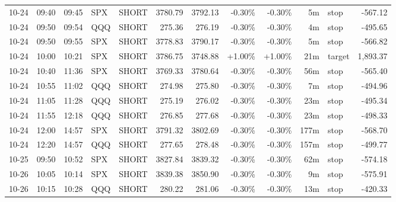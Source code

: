 \documentclass[11pt,a4paper]{article}
\begin{document}
\begin{center}
\begin{longtable}{>{\color{txtmain}}l l l l l r r r r r >{\color{txtmain}}l r}
10-24 & 09:40 & 09:45 & SPX & SHORT & 3780.79 & 3792.13 & \textcolor{lossred}{-0.30\%} & \textcolor{lossred}{-0.30\%} & 5m & stop & \textcolor{lossred}{-567.12} \\
10-24 & 09:50 & 09:54 & QQQ & SHORT & 275.36 & 276.19 & \textcolor{lossred}{-0.30\%} & \textcolor{lossred}{-0.30\%} & 4m & stop & \textcolor{lossred}{-495.65} \\
10-24 & 09:50 & 09:55 & SPX & SHORT & 3778.83 & 3790.17 & \textcolor{lossred}{-0.30\%} & \textcolor{lossred}{-0.30\%} & 5m & stop & \textcolor{lossred}{-566.82} \\
10-24 & 10:00 & 10:21 & SPX & SHORT & 3786.75 & 3748.88 & \textcolor{wingreen}{+1.00\%} & \textcolor{wingreen}{+1.00\%} & 21m & target & \textcolor{wingreen}{1,893.37} \\
10-24 & 10:40 & 11:36 & SPX & SHORT & 3769.33 & 3780.64 & \textcolor{lossred}{-0.30\%} & \textcolor{lossred}{-0.30\%} & 56m & stop & \textcolor{lossred}{-565.40} \\
10-24 & 10:55 & 11:02 & QQQ & SHORT & 274.98 & 275.80 & \textcolor{lossred}{-0.30\%} & \textcolor{lossred}{-0.30\%} & 7m & stop & \textcolor{lossred}{-494.96} \\
10-24 & 11:05 & 11:28 & QQQ & SHORT & 275.19 & 276.02 & \textcolor{lossred}{-0.30\%} & \textcolor{lossred}{-0.30\%} & 23m & stop & \textcolor{lossred}{-495.34} \\
10-24 & 11:55 & 12:18 & QQQ & SHORT & 276.85 & 277.68 & \textcolor{lossred}{-0.30\%} & \textcolor{lossred}{-0.30\%} & 23m & stop & \textcolor{lossred}{-498.33} \\
10-24 & 12:00 & 14:57 & SPX & SHORT & 3791.32 & 3802.69 & \textcolor{lossred}{-0.30\%} & \textcolor{lossred}{-0.30\%} & 177m & stop & \textcolor{lossred}{-568.70} \\
10-24 & 12:20 & 14:57 & QQQ & SHORT & 277.65 & 278.48 & \textcolor{lossred}{-0.30\%} & \textcolor{lossred}{-0.30\%} & 157m & stop & \textcolor{lossred}{-499.77} \\
10-25 & 09:50 & 10:52 & SPX & SHORT & 3827.84 & 3839.32 & \textcolor{lossred}{-0.30\%} & \textcolor{lossred}{-0.30\%} & 62m & stop & \textcolor{lossred}{-574.18} \\
10-26 & 10:05 & 10:14 & SPX & SHORT & 3839.38 & 3850.90 & \textcolor{lossred}{-0.30\%} & \textcolor{lossred}{-0.30\%} & 9m & stop & \textcolor{lossred}{-575.91} \\
10-26 & 10:15 & 10:28 & QQQ & SHORT & 280.22 & 281.06 & \textcolor{lossred}{-0.30\%} & \textcolor{lossred}{-0.30\%} & 13m & stop & \textcolor{lossred}{-420.33} \\

\end{longtable}
\end{center}
\end{document}
